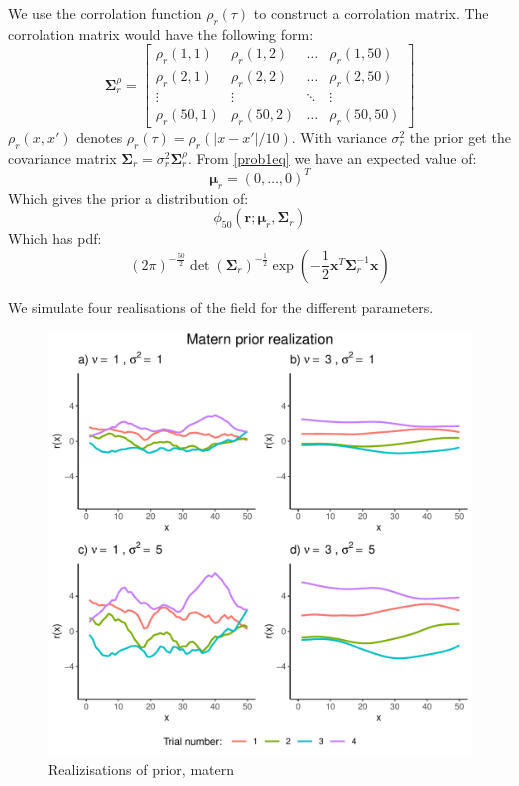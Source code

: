 \documentclass[]{article}
\newcommand{\vect}[1]{\ensuremath{\boldsymbol{\mathbf{#1}}}}
\newcommand{\matr}[1]{\ensuremath{\boldsymbol{\mathbf{#1}}}}
\begin{document}
We use the corrolation function \(\rho_r(\tau)\) to construct a
corrolation matrix. The corrolation matrix would have the following
form: \begin{equation}
    \matr \Sigma_r^\rho = 
    \begin{bmatrix}
        \rho_r(1, 1) & \rho_r(1, 2) & \dots & \rho_r(1, 50) \\
        \rho_r(2, 1) & \rho_r(2, 2) & \dots & \rho_r(2, 50) \\
        \vdots & \vdots & \ddots & \vdots \\
        \rho_r(50, 1) & \rho_r(50, 2) & \dots & \rho_r(50, 50)
    \end{bmatrix}
\end{equation} \(\rho_r(x, x')\) denotes
\(\rho_r(\tau) = \rho_r(|x-x'|/10)\). With variance \(\sigma_r^2\) the
prior get the covariance matrix
\(\matr \Sigma_r = \sigma_r^2 \matr \Sigma_r^\rho\). From
\eqref{prob1eq} we have an expected value of: \begin{equation}
    \vect \mu_r = (0, \dots, 0)^T
\end{equation} Which gives the prior a distribution of: \begin{equation}
    \phi_{50}(\vect r ; \vect \mu_r, \matr \Sigma_r)
\end{equation} Which has pdf: \begin{equation}
    (2\pi)^{-\frac{50}{2}}\det(\matr \Sigma_r)^{-\frac{1}{2}}\exp\left(-\frac{1}{2}\vect x^T\matr \Sigma_r^{-1}\vect x\right)
\end{equation}

We simulate four realisations of the field for the different parameters.

\begin{figure}

{\centering \includegraphics{Exercise-1_files/figure-latex/fig1b1-1} 

}

\caption{\label{fig:fig1b1} Realizisations of prior, matern}\label{fig:fig1b1}
\end{figure}
\end{document}
